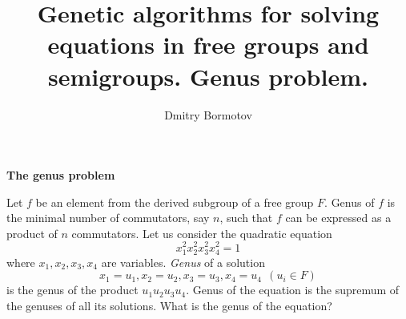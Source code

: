 \documentclass[12pt]{slides}
\title{Genetic algorithms for solving
equations in free groups and semigroups.  Genus problem.}
\author{Dmitry Bormotov} \date{}
\begin{document}
\pagestyle{empty}

\begin{center} \Large\textbf{The genus problem} \end{center}
\vspace{3mm}
Let $f$ be an element from the derived subgroup of a free
group $F$. Genus of $f$ is the minimal number of
commutators, say $n$, such that $f$ can be expressed as a
product of $n$ commutators. Let us consider the quadratic equation
\[
x_1^2 x_2^2 x_3^2 x_4^2 = 1 
\]
where $x_1,x_2,x_3,x_4$ are variables. {\em Genus } of a solution 
\[
x_1= u_1, x_2 = u_2, x_3 = u_3, x_4 = u_4 \ \  ( u_i \in F )
\]
is the genus of
the product $u_1 u_2 u_3 u_4$.
Genus of the equation is the supremum of the genuses of all its
solutions.  What is the genus of the equation?
\end{document}
